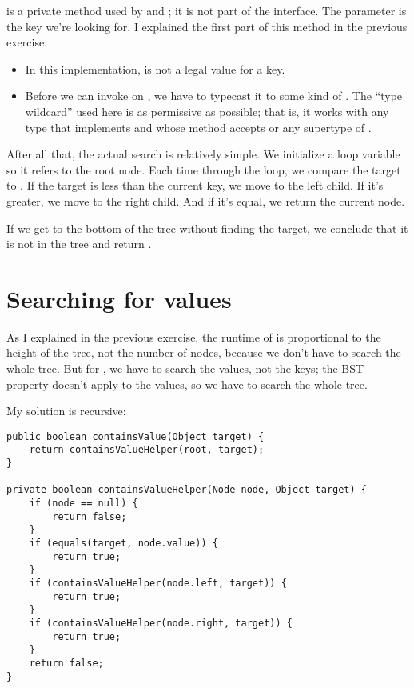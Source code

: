 \documentclass[12pt]{book}
\theoremstyle{exercise}
\begin{document}
 is a private method used by  and
; it is not part of the  interface. The
parameter  is the key we're looking for. I explained the
first part of this method in the previous exercise:

\begin{itemize}

\item
  In this implementation,  is not a legal value for a key.

\item
  Before we can invoke  on , we have to
  typecast it to some kind of . The ``type wildcard''
  used here is as permissive as possible; that is, it works with any
  type that implements  and whose 
  method accepts  or any supertype of .

\end{itemize}


After all that, the actual search is relatively simple. We initialize a
loop variable  so it refers to the root node. Each time
through the loop, we compare the target to . If the
target is less than the current key, we move to the left child. If it's
greater, we move to the right child. And if it's equal, we return the
current node.

If we get to the bottom of the tree without finding the target, we
conclude that it is not in the tree and return .


\section{Searching for values}
\label{searching-for-values}

As I explained in the previous exercise, the runtime of
 is proportional to the height of the tree, not the
number of nodes, because we don't have to search the whole tree. But
for , we have to search the values, not the keys;
the BST property doesn't apply to the values, so we have to search the
whole tree.


My solution is recursive:

\begin{verbatim}
public boolean containsValue(Object target) {
    return containsValueHelper(root, target);
}

private boolean containsValueHelper(Node node, Object target) {
    if (node == null) {
        return false;
    }
    if (equals(target, node.value)) {
        return true;
    }
    if (containsValueHelper(node.left, target)) {
        return true;
    }
    if (containsValueHelper(node.right, target)) {
        return true;
    }
    return false;
}
\end{verbatim}
\end{document}
